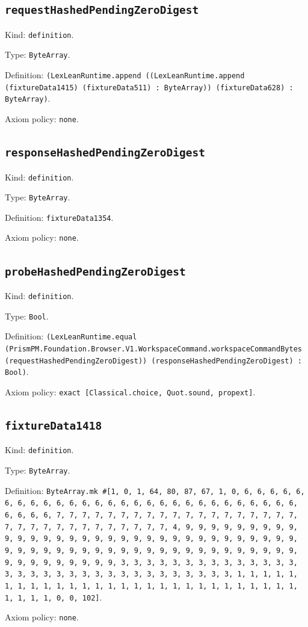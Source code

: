 \documentclass[11pt]{article}
\begin{document}
\subsection*{\texttt{requestHashedPendingZeroDigest}}
\noindent Kind: \texttt{definition}.\par
\noindent Type: \texttt{ByteArray}.\par
\noindent Definition: \texttt{(LexLeanRuntime.append ((LexLeanRuntime.append (fixtureData1415) (fixtureData511) : ByteArray)) (fixtureData628) : ByteArray)}.\par
\noindent Axiom policy: \texttt{none}.\par
\subsection*{\texttt{responseHashedPendingZeroDigest}}
\noindent Kind: \texttt{definition}.\par
\noindent Type: \texttt{ByteArray}.\par
\noindent Definition: \texttt{fixtureData1354}.\par
\noindent Axiom policy: \texttt{none}.\par
\subsection*{\texttt{probeHashedPendingZeroDigest}}
\noindent Kind: \texttt{definition}.\par
\noindent Type: \texttt{Bool}.\par
\noindent Definition: \texttt{(LexLeanRuntime.equal (PrismPM.Foundation.Browser.V1.WorkspaceCommand.workspaceCommandBytes (requestHashedPendingZeroDigest)) (responseHashedPendingZeroDigest) : Bool)}.\par
\noindent Axiom policy: \texttt{exact [Classical.choice, Quot.sound, propext]}.\par
\subsection*{\texttt{fixtureData1418}}
\noindent Kind: \texttt{definition}.\par
\noindent Type: \texttt{ByteArray}.\par
\noindent Definition: \texttt{ByteArray.mk \#[1, 0, 1, 64, 80, 87, 67, 1, 0, 6, 6, 6, 6, 6, 6, 6, 6, 6, 6, 6, 6, 6, 6, 6, 6, 6, 6, 6, 6, 6, 6, 6, 6, 6, 6, 6, 6, 6, 6, 6, 6, 7, 7, 7, 7, 7, 7, 7, 7, 7, 7, 7, 7, 7, 7, 7, 7, 7, 7, 7, 7, 7, 7, 7, 7, 7, 7, 7, 7, 7, 7, 7, 7, 4, 9, 9, 9, 9, 9, 9, 9, 9, 9, 9, 9, 9, 9, 9, 9, 9, 9, 9, 9, 9, 9, 9, 9, 9, 9, 9, 9, 9, 9, 9, 9, 9, 9, 9, 9, 9, 9, 9, 9, 9, 9, 9, 9, 9, 9, 9, 9, 9, 9, 9, 9, 9, 9, 9, 9, 9, 9, 9, 9, 9, 9, 9, 9, 9, 3, 3, 3, 3, 3, 3, 3, 3, 3, 3, 3, 3, 3, 3, 3, 3, 3, 3, 3, 3, 3, 3, 3, 3, 3, 3, 3, 3, 3, 3, 3, 3, 1, 1, 1, 1, 1, 1, 1, 1, 1, 1, 1, 1, 1, 1, 1, 1, 1, 1, 1, 1, 1, 1, 1, 1, 1, 1, 1, 1, 1, 1, 1, 1, 0, 0, 102]}.\par
\noindent Axiom policy: \texttt{none}.\par
\end{document}
